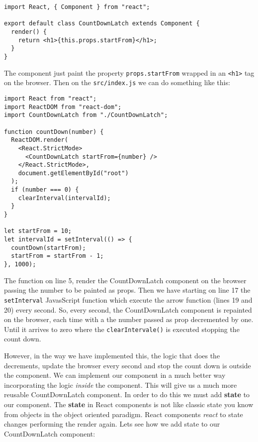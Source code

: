 \documentclass[a4paper, oneside, titlepage, 12pt]{book}
\begin{document}
\begin{verbatim}
import React, { Component } from "react";

export default class CountDownLatch extends Component {
  render() {
    return <h1>{this.props.startFrom}</h1>;
  }
}
\end{verbatim}

The component just paint the property \texttt{props.startFrom} wrapped in an \texttt{<h1>} tag on the browser. Then on the \texttt{src/index.js} we can do something like this:

\begin{verbatim}
import React from "react";
import ReactDOM from "react-dom";
import CountDownLatch from "./CountDownLatch";

function countDown(number) {
  ReactDOM.render(
    <React.StrictMode>
      <CountDownLatch startFrom={number} />
    </React.StrictMode>,
    document.getElementById("root")
  );
  if (number === 0) {
    clearInterval(intervalId);
  }
}

let startFrom = 10;
let intervalId = setInterval(() => {
  countDown(startFrom);
  startFrom = startFrom - 1;
}, 1000);
\end{verbatim}

The function on line 5, render the CountDownLatch component on the browser passing the number to be painted as props. Then we have starting on line 17 the \texttt{setInterval} JavasScript function which execute the arrow function (lines 19 and 20) every second. So, every second, the CountDownLatch component is repainted on the browser, each time with a the number passed as prop decremented by one. Until it arrives to zero where the \texttt{clearIntervale()} is executed stopping the count down.
\newline 

However, in the way we have implemented this, the logic that does the decrements, update the browser every second and stop the count down is outside the component. We can implement our component in a much better way incorporating the logic \textit{inside} the component. This will give us a much more reusable CountDownLatch component. In order to do this we must add \textbf{state} to our component. The \textbf{state} in React components is not like classic state you know from objects in the object oriented paradigm. React components \textit{react} to state changes performing the render again. Lets see how we add state to our CountDownLatch component:
\end{document}
